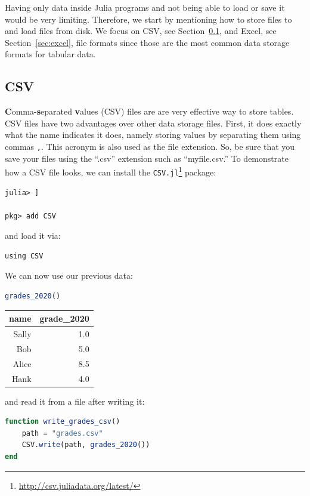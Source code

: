 \documentclass[
  notoc %
]{tufte-book}
\DeclareRobustCommand{\href}[2]{#2\footnote{\url{#1}}}
\newcommand{\passthrough}[1]{#1}
\begin{document}
Having only data inside Julia programs and not being able to load or
save it would be very limiting. Therefore, we start by mentioning how to
store files to and load files from disk. We focus on CSV, see
Section~\ref{sec:csv}, and Excel, see Section~\ref{sec:excel}, file
formats since those are the most common data storage formats for tabular
data.

\hypertarget{sec:csv}{%
\subsection{CSV}\label{sec:csv}}

\textbf{C}omma-\textbf{s}eparated \textbf{v}alues (CSV) files are are
very effective way to store tables. CSV files have two advantages over
other data storage files. First, it does exactly what the name indicates
it does, namely storing values by separating them using commas
\passthrough{\lstinline!,!}. This acronym is also used as the file
extension. So, be sure that you save your files using the ``.csv''
extension such as ``myfile.csv.'' To demonstrate how a CSV file looks,
we can install the
\href{http://csv.juliadata.org/latest/}{\passthrough{\lstinline!CSV.jl!}}
package:

\begin{lstlisting}
julia> ]

pkg> add CSV
\end{lstlisting}

and load it via:

\begin{lstlisting}
using CSV
\end{lstlisting}

We can now use our previous data:

\begin{lstlisting}[language=Julia]
grades_2020()
\end{lstlisting}

\begin{longtable}[]{@{}rr@{}}
\toprule
name & grade\_2020 \\
\midrule
\endhead
Sally & 1.0 \\
Bob & 5.0 \\
Alice & 8.5 \\
Hank & 4.0 \\
\bottomrule
\end{longtable}

and read it from a file after writing it:

\begin{lstlisting}[language=Julia]
function write_grades_csv()
    path = "grades.csv"
    CSV.write(path, grades_2020())
end
\end{lstlisting}
\end{document}
